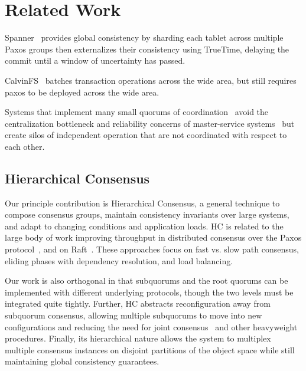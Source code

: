 
\renewcommand{\thechapter}{7}

\chapter{Related Work}

Spanner~\cite{spanner} provides global consistency by sharding each tablet across multiple Paxos groups then externalizes their consistency using TrueTime, delaying the commit until a window of uncertainty has passed.

CalvinFS~\cite{calvindb,calvinfs} batches transaction operations across the wide area, but still requires paxos to be deployed across the wide area.

Systems that implement many small quorums of
coordination~\cite{mdcc,scatter,spanner} avoid the centralization bottleneck
and reliability concerns of master-service
systems~\cite{gray_dangers_1996,gfs} but create silos of independent
operation that are not coordinated with respect to each other.

\section{Hierarchical Consensus}

Our principle contribution is Hierarchical Consensus, a general technique to compose consensus groups, maintain consistency invariants over large systems, and adapt to changing conditions and application loads.
HC is related to the large body of work improving throughput in distributed consensus over the Paxos protocol~\cite{paxos,epaxos,fexible_paxos,generalized_paxos}, and on Raft~\cite{raft,raft_refloated}.
These approaches focus on fast vs. slow path consensus, eliding phases with dependency resolution, and load balancing.

Our work is also orthogonal in that subquorums and the root quorums can be implemented with different underlying protocols, though the two levels must be integrated quite tightly.
Further, HC abstracts reconfiguration away from subquorum consensus, allowing multiple subquorums to move into new configurations and reducing the need for joint consensus~\cite{raft} and other heavyweight procedures.
Finally, its hierarchical nature allows the system to multiplex multiple consensus instances on disjoint partitions of the object space while still maintaining global consistency guarantees.

